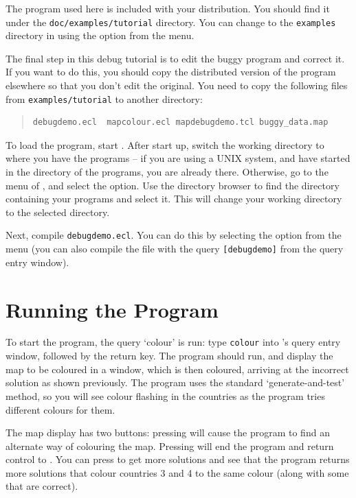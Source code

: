 The program used here is included with your {\eclipse} distribution. You
should find it under the \texttt{doc/examples/tutorial} directory. You can
change to the \texttt{examples} directory in {\tkeclipse} using the
 option from the  menu.

The final step in this debug tutorial is to edit the buggy program and
correct it. If you want to do this, you should copy the distributed version
of the program elsewhere so that you don't edit the original. You need to
copy the following files from \verb'examples/tutorial' to another directory:

\begin{quote}\begin{verbatim}
debugdemo.ecl  mapcolour.ecl mapdebugdemo.tcl buggy_data.map
\end{verbatim}\end{quote}

To load the program, start {\tkeclipse}. After start up, 
switch the working directory to
where you have the programs -- if you are using a UNIX system, and have
started {\tkeclipse} in the directory of the programs, you are already
there. Otherwise, go to the  menu of {\tkeclipse}, and select
the  option. Use the directory browser to find
the directory containing your programs and select it. This will change your
working directory to the selected directory.

Next, compile \verb'debugdemo.ecl'. You can do this by selecting the
 option from the  menu (you can also compile
the file with the query \verb'[debugdemo]' from the query entry
window). 

\section{Running the Program}
To start the program, the query `colour' is run: type \verb'colour' 
into {\tkeclipse}'s query entry window, followed by the
return key. The program should run, and display the map to be coloured in a
window, which is then coloured, arriving at the
incorrect solution as shown previously. The program uses
the standard `generate-and-test' method, so you will see colour flashing in
the countries as the program tries different colours for them.

The map display has two buttons: pressing  will cause the program to
find an alternate way of colouring the map. Pressing  will end the
program and return control to {\eclipse}. You can press  to get more
solutions and see that the program returns more solutions that colour
countries 3 and 4 to the same colour (along with some that are correct).

